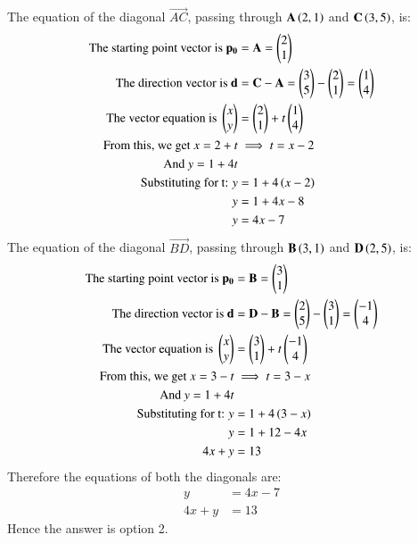 \documentclass[journal]{IEEEtran}
\theoremstyle{remark}
\begin{document}
The equation of the diagonal $\vec{AC}$, passing through $\mathbf{A}\left(2, 1\right)$ and $\mathbf{C}\left(3, 5\right)$, is:
\begin{align}
    \text{The starting point vector is } \mathbf{p_0} &= \mathbf{A} = \begin{pmatrix}2\\1\end{pmatrix} \\
    \text{The direction vector is } \mathbf{d} &= \mathbf{C} - \mathbf{A} = \begin{pmatrix}3\\5\end{pmatrix} - \begin{pmatrix}2\\1\end{pmatrix} = \begin{pmatrix}1\\4\end{pmatrix} \\
    \text{The vector equation is } \begin{pmatrix}x\\y\end{pmatrix} &= \begin{pmatrix}2\\1\end{pmatrix} + t\begin{pmatrix}1\\4\end{pmatrix} \\
    \text{From this, we get } x = 2 + t &\implies t = x-2 \\
    \text{And } y = 1 + 4t \\
    \text{Substituting for t: } y &= 1 + 4\left(x-2\right) \\
    y &= 1 + 4x - 8 \\
    y &= 4x - 7
\end{align}
The equation of the diagonal $\vec{BD}$, passing through $\mathbf{B}\left(3, 1\right)$ and $\mathbf{D}\left(2, 5\right)$, is:
\begin{align}
    \text{The starting point vector is } \mathbf{p_0} &= \mathbf{B} = \begin{pmatrix}3\\1\end{pmatrix} \\
    \text{The direction vector is } \mathbf{d} &= \mathbf{D} - \mathbf{B} = \begin{pmatrix}2\\5\end{pmatrix} - \begin{pmatrix}3\\1\end{pmatrix} = \begin{pmatrix}-1\\4\end{pmatrix} \\
    \text{The vector equation is } \begin{pmatrix}x\\y\end{pmatrix} &= \begin{pmatrix}3\\1\end{pmatrix} + t\begin{pmatrix}-1\\4\end{pmatrix} \\
    \text{From this, we get } x = 3 - t &\implies t = 3-x \\
    \text{And } y = 1 + 4t \\
    \text{Substituting for t: } y &= 1 + 4\left(3-x\right) \\
    y &= 1 + 12 - 4x \\
    4x + y &= 13
\end{align}
Therefore the equations of both the diagonals are:
\begin{align}
    y &= 4x - 7 \\
    4x + y &= 13
\end{align}
Hence the answer is option 2.
\end{document}
